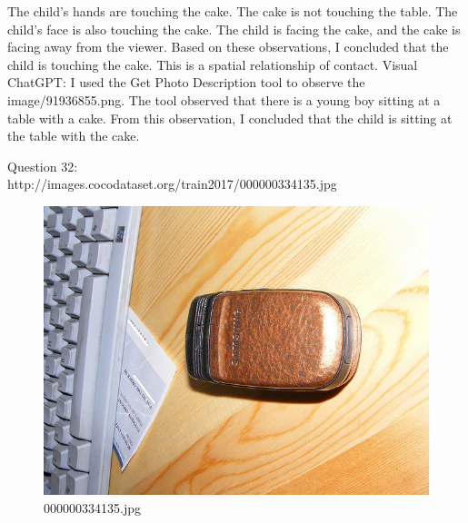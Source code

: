 \begin{enumerate}
        The child's hands are touching the cake.
        The cake is not touching the table.
        The child's face is also touching the cake.
        The child is facing the cake, and the cake is facing away from the viewer.
        Based on these observations, I concluded that the child is touching the cake. This is a spatial relationship of contact.
        \subitem Visual ChatGPT: I used the Get Photo Description tool to observe the image/91936855.png. The tool observed that there is a young boy sitting at a table with a cake. From this observation, I concluded that the child is sitting at the table with the cake.
    \end{enumerate}
    Question 32:\\http://images.cocodataset.org/train2017/000000334135.jpg
    \begin{figure}[h]
        \centering
        \includegraphics[width=0.8\linewidth]{../image set/easy/000000334135.jpg}
        \caption{000000334135.jpg}
    \end{figure}
